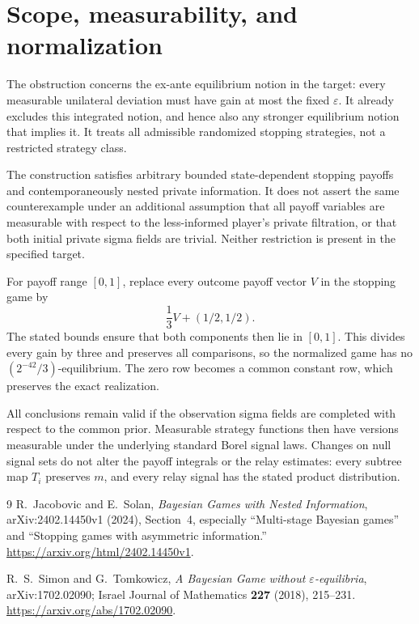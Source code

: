 \documentclass[11pt]{article}
\theoremstyle{remark}
\begin{document}
\section{Scope, measurability, and normalization}

The obstruction concerns the ex-ante equilibrium notion in the target:
every measurable unilateral deviation must have gain at most the fixed
$\varepsilon$. It already excludes this integrated notion, and hence
also any stronger equilibrium notion that implies it. It treats all
admissible randomized stopping strategies, not a restricted strategy
class.

The construction satisfies arbitrary bounded state-dependent stopping
payoffs and contemporaneously nested private information. It does not
assert the same counterexample under an additional assumption that all
payoff variables are measurable with respect to the less-informed
player's private filtration, or that both initial private sigma fields
are trivial. Neither restriction is present in the specified target.

For payoff range $[0,1]$, replace every outcome payoff vector $V$ in
the stopping game by
\[
 \frac13V+(1/2,1/2).
\]
The stated bounds ensure that both components then lie in $[0,1]$.
This divides every gain by three and preserves all comparisons, so the
normalized game has no $(2^{-42}/3)$-equilibrium. The zero row becomes
a common constant row, which preserves the exact realization.

All conclusions remain valid if the observation sigma fields are
completed with respect to the common prior. Measurable strategy
functions then have versions measurable under the underlying standard
Borel signal laws. Changes on null signal sets do not alter the payoff
integrals or the relay estimates: every subtree map $T_i$ preserves
$m$, and every relay signal has the stated product distribution.

\begin{thebibliography}{9}
R.~Jacobovic and E.~Solan,
\emph{Bayesian Games with Nested Information},
arXiv:2402.14450v1 (2024), Section~4, especially
``Multi-stage Bayesian games'' and
``Stopping games with asymmetric information.''
\url{https://arxiv.org/html/2402.14450v1}.

R.~S.~Simon and G.~Tomkowicz,
\emph{A Bayesian Game without $\varepsilon$-equilibria},
arXiv:1702.02090; Israel Journal of Mathematics \textbf{227}
(2018), 215--231.
\url{https://arxiv.org/abs/1702.02090}.
\end{thebibliography}
\end{document}
